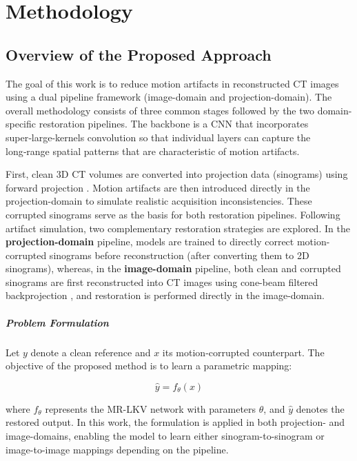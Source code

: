 \chapter{Methodology}
\label{chap:methodology}
\section{ Overview of the Proposed Approach} 


The goal of this work is to reduce motion artifacts in reconstructed CT images using a dual pipeline framework (image-domain and projection-domain). The overall methodology consists of three common stages followed by the two domain-specific restoration pipelines. The backbone is a CNN that incorporates super‑large-kernels convolution so that individual layers can capture the long‑range spatial patterns that are characteristic of motion artifacts. 

First, clean 3D CT volumes are converted into projection data (sinograms) using forward projection \cite{diffct2025}. Motion artifacts are then introduced directly in the projection-domain to simulate realistic acquisition inconsistencies. These corrupted sinograms serve as the basis for both restoration pipelines.
Following artifact simulation, two complementary restoration strategies are explored.  
In the \textbf{projection-domain} pipeline, models are trained to directly correct motion-corrupted sinograms before reconstruction (after converting them to 2D sinograms), whereas, in the \textbf{image-domain }pipeline, both clean and corrupted sinograms are first reconstructed into CT images using cone-beam filtered backprojection \cite{diffct2025}, and restoration is performed directly in the image-domain.

\paragraph{Problem Formulation}
Let $y$ denote a clean reference and $x $ its motion-corrupted counterpart. 
The objective of the proposed method is to learn a parametric mapping:

\begin{equation}
\hat{y} = f_\theta(x)
\end{equation}

where $f_\theta$ represents the MR-LKV network with parameters $\theta$, and $\hat{y}$ denotes the restored output. 
In this work, the formulation is applied in both projection- and image-domains, enabling the model to learn either sinogram-to-sinogram or image-to-image mappings depending on the pipeline.


